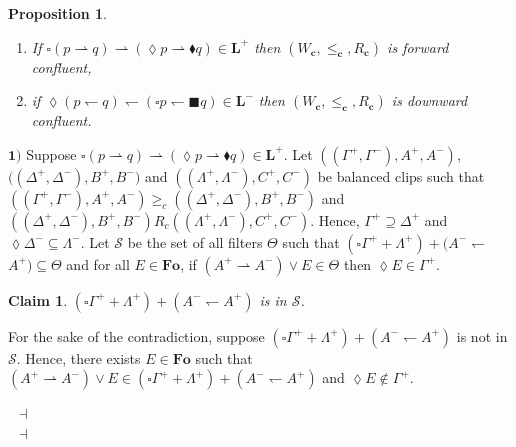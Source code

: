 \documentclass[draft]{article}
\newtheorem{claim}{Claim}
\newtheorem{proposition}{Proposition}
\newenvironment{proof}{{\bf Proof:}}{~$\dashv$\\}
\def\Fo{\mathbf{Fo}}
\def\L{\mathbf{L}}
\begin{document}
%
%
\begin{proposition}\label{Proposition:the:following:conditions:are:equivalent:is:forward:confluent}
%
%
\begin{enumerate}
%
%
\item If ${\square}(p{\rightharpoonup}q){\rightharpoonup}({\lozenge}p{\rightharpoonup}{\blacklozenge}q){\in}\L^{+}$ then $(W_{\mathbf{c}},{\leq_{\mathbf{c}}},{R_{\mathbf{c}}})$ is forward confluent,
%
%
\item if ${\lozenge}(p{\leftharpoondown}q){\leftharpoondown}({\square}p{\leftharpoondown}{\blacksquare}q){\in}\L^{-}$ then $(W_{\mathbf{c}},{\leq_{\mathbf{c}}},{R_{\mathbf{c}}})$ is downward confluent.
%
%
\end{enumerate}
%
%
\end{proposition}
%
%
\begin{proof}
%
%
$\mathbf{1)}$ Suppose ${\square}(p{\rightharpoonup}q){\rightharpoonup}({\lozenge}p{\rightharpoonup}{\blacklozenge}q){\in}\L^{+}$.
Let $((\Gamma^{+},\Gamma^{-}),A^{+},A^{-})$, $((\Delta^{+},\Delta^{-}),
%
%
%
%
%
%
%
$\linebreak$
%
%
%
%
%
%
B^{+},B^{-})$ and $((\Lambda^{+},\Lambda^{-}),C^{+},C^{-})$ be balanced clips such that $((\Gamma^{+},\Gamma^{-}),A^{+},A^{-}){\geq_{c}}
%
%
%
%
%
%
%
$\linebreak$
%
%
%
%
%
%
((\Delta^{+},\Delta^{-}),B^{+},B^{-})$ and $((\Delta^{+},\Delta^{-}),B^{+},B^{-}){R_{c}}((\Lambda^{+},\Lambda^{-}),C^{+},C^{-})$.
Hence, $\Gamma^{+}
%
%
%
%
%
%
%
$\linebreak$
%
%
%
%
%
%
{\supseteq}\Delta^{+}$ and ${\lozenge}\Delta^{-}{\subseteq}\Lambda^{-}$.
Let ${\mathcal S}$ be the set of all filters $\Theta$ such that $({\square}\Gamma^{+}{+}\Lambda^{+}){+}(A^{-}{\leftharpoondown}
%
%
%
%
%
%
%
$\linebreak$
%
%
%
%
%
%
A^{+}){\subseteq}\Theta$ and for all $E{\in}\Fo$, if $(A^{+}{\rightharpoonup}A^{-}){\vee}E{\in}\Theta$ then ${\lozenge}E{\in}\Gamma^{+}$.
%
%
\begin{claim}
%
%
$({\square}\Gamma^{+}{+}\Lambda^{+}){+}(A^{-}{\leftharpoondown}A^{+})$ is in ${\mathcal S}$.
%
%
\end{claim}
%
%
\begin{proof}
%
%
For the sake of the contradiction, suppose $({\square}\Gamma^{+}{+}\Lambda^{+}){+}(A^{-}{\leftharpoondown}A^{+})$ is not in ${\mathcal S}$.
Hence, there exists $E{\in}\Fo$ such that $(A^{+}{\rightharpoonup}A^{-}){\vee}E{\in}({\square}\Gamma^{+}{+}\Lambda^{+}){+}(A^{-}{\leftharpoondown}A^{+})$ and ${\lozenge}E{\not\in}\Gamma^{+}$.

\end{proof}
\end{proof}
\end{document}

